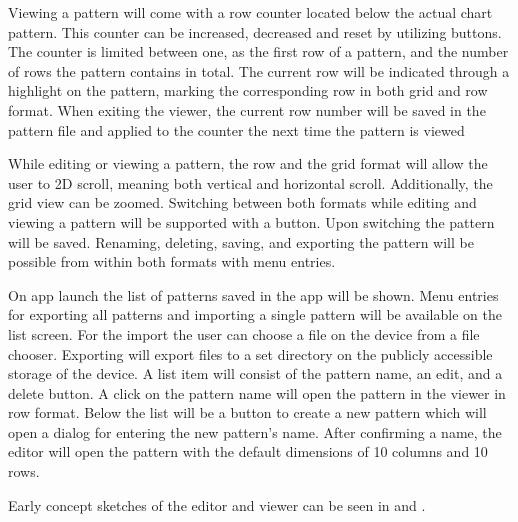 Viewing a pattern will come with a row counter located below the actual chart pattern. This counter can be increased, decreased and reset by utilizing buttons. The counter is limited between one, as the first row of a pattern, and the number of rows the pattern contains in total. The current row will be indicated through a highlight on the pattern, marking the corresponding row in both grid and row format. When exiting the viewer, the current row number will be saved in the pattern file and applied to the counter the next time the pattern is viewed

While editing or viewing a pattern, the row and the grid format will allow the user to 2D scroll, meaning both vertical and horizontal scroll. Additionally, the grid view can be zoomed. Switching between both formats while editing and viewing a pattern will be supported with a button. Upon switching the pattern will be saved. Renaming, deleting, saving, and exporting the pattern will be possible from within both formats with menu entries.

On app launch the list of patterns saved in the app will be shown. Menu entries for exporting all patterns and importing a single pattern will be available on the list screen. For the import the user can choose a file on the device from a file chooser. Exporting will export files to a set directory on the publicly accessible storage of the device. A list item will consist of the pattern name, an edit, and a delete button. A click on the pattern name will open the pattern in the viewer in row format. Below the list will be a button to create a new pattern which will open a dialog for entering the new pattern’s name. After confirming a name, the editor will open the pattern with the default dimensions of 10 columns and 10 rows.

Early concept sketches of the editor and viewer can be seen in  and .

